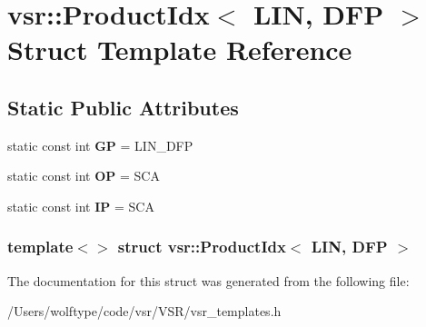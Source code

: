 \hypertarget{structvsr_1_1_product_idx_3_01_l_i_n_00_01_d_f_p_01_4}{\section{vsr\-:\-:Product\-Idx$<$ L\-I\-N, D\-F\-P $>$ Struct Template Reference}
\label{structvsr_1_1_product_idx_3_01_l_i_n_00_01_d_f_p_01_4}
}
\subsection*{Static Public Attributes}
\begin{DoxyCompactItemize}
\item 
\hypertarget{structvsr_1_1_product_idx_3_01_l_i_n_00_01_d_f_p_01_4_aba25dff8fca265b8c95e34cc1a5e1e45}{static const int {\bfseries G\-P} = L\-I\-N\-\_\-\-D\-F\-P}\label{structvsr_1_1_product_idx_3_01_l_i_n_00_01_d_f_p_01_4_aba25dff8fca265b8c95e34cc1a5e1e45}

\item 
\hypertarget{structvsr_1_1_product_idx_3_01_l_i_n_00_01_d_f_p_01_4_af44b91321f037cb5711a30c9db94861f}{static const int {\bfseries O\-P} = S\-C\-A}\label{structvsr_1_1_product_idx_3_01_l_i_n_00_01_d_f_p_01_4_af44b91321f037cb5711a30c9db94861f}

\item 
\hypertarget{structvsr_1_1_product_idx_3_01_l_i_n_00_01_d_f_p_01_4_ab86d90ba49314e96b58b6b6a89489afe}{static const int {\bfseries I\-P} = S\-C\-A}\label{structvsr_1_1_product_idx_3_01_l_i_n_00_01_d_f_p_01_4_ab86d90ba49314e96b58b6b6a89489afe}

\end{DoxyCompactItemize}
\subsubsection*{template$<$$>$ struct vsr\-::\-Product\-Idx$<$ L\-I\-N, D\-F\-P $>$}



The documentation for this struct was generated from the following file\-:\begin{DoxyCompactItemize}
\item 
/\-Users/wolftype/code/vsr/\-V\-S\-R/vsr\-\_\-templates.\-h\end{DoxyCompactItemize}
